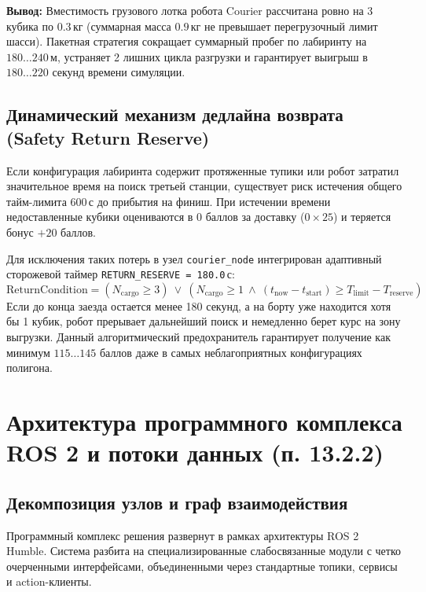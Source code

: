 \documentclass[a4paper,11pt]{article}
\begin{document}
\textbf{Вывод:} Вместимость грузового лотка робота Courier рассчитана ровно на 3 кубика по $0.3$\,кг (суммарная масса $0.9$\,кг не превышает перегрузочный лимит шасси). Пакетная стратегия сокращает суммарный пробег по лабиринту на $180\dots240$\,м, устраняет 2 лишних цикла разгрузки и гарантирует выигрыш в $180\dots220$ секунд времени симуляции.

\subsection{Динамический механизм дедлайна возврата (Safety Return Reserve)}
Если конфигурация лабиринта содержит протяженные тупики или робот затратил значительное время на поиск третьей станции, существует риск истечения общего тайм-лимита 600\,с до прибытия на финиш. При истечении времени недоставленные кубики оцениваются в $0$ баллов за доставку ($0 \times 25$) и теряется бонус $+20$ баллов.

Для исключения таких потерь в узел \texttt{courier\_node} интегрирован адаптивный сторожевой таймер \texttt{RETURN\_RESERVE = 180.0}\,с:
\begin{equation}
\text{ReturnCondition} = \left( N_{\text{cargo}} \ge 3 \right) \ \lor \ \left( N_{\text{cargo}} \ge 1 \ \land \ (t_{\text{now}} - t_{\text{start}}) \ge T_{\text{limit}} - T_{\text{reserve}} \right)
\label{eq:deadline}
\end{equation}
Если до конца заезда остается менее 180 секунд, а на борту уже находится хотя бы 1 кубик, робот прерывает дальнейший поиск и немедленно берет курс на зону выгрузки. Данный алгоритмический предохранитель гарантирует получение как минимум $115\dots145$ баллов даже в самых неблагоприятных конфигурациях полигона.

\section{Архитектура программного комплекса ROS 2 и потоки данных (п. 13.2.2)}

\subsection{Декомпозиция узлов и граф взаимодействия}
Программный комплекс решения развернут в рамках архитектуры ROS 2 Humble. Система разбита на специализированные слабосвязанные модули с четко очерченными интерфейсами, объединенными через стандартные топики, сервисы и action-клиенты.
\end{document}
